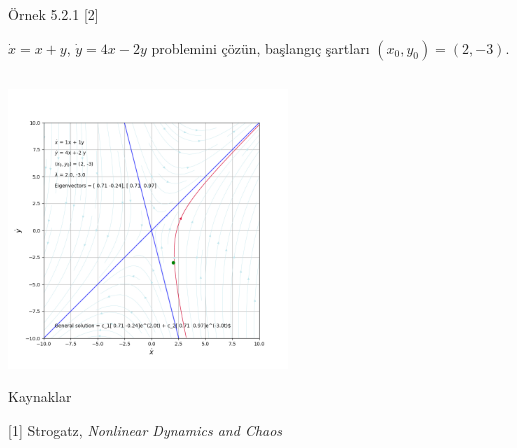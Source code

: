 \documentclass[12pt,fleqn]{article}\usepackage{../../common}
\begin{document}
Örnek 5.2.1 [2]

$\dot{x} = x + y$, $\dot{y} = 4x-2y$ problemini çözün, başlangıç şartları
$(x_0,y_0) = (2,-3)$.

\inputminted[fontsize=\footnotesize]{python}{ex5.2.1.py}

\includegraphics[width=20em]{05_27.png}

Kaynaklar

[1] Strogatz, {\em Nonlinear Dynamics and Chaos}
\end{document}
